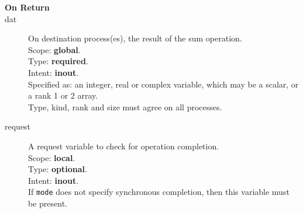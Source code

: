 \begin{description}
\item[\bf On Return]
\item[dat] On destination process(es), the result of the sum operation.\\
Scope: {\bf global}.\\
Type: {\bf required}.\\
Intent: {\bf inout}.\\
Specified as: an integer, real or complex variable, which may be a
scalar, or a rank 1 or 2 array. \\
Type, kind, rank and size must agree on all processes.
\item[request] A request variable to check for operation completion.\\
Scope: {\bf local}.\\
Type: {\bf optional}.\\
Intent: {\bf inout}.\\
If \verb|mode| does not specify synchronous completion, then this
variable must be present.
\end{description}

